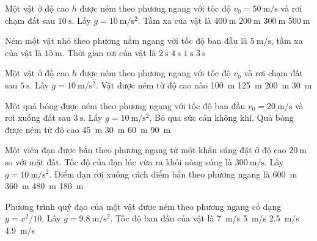 \begin{ex}
	Một vật ở độ cao $h$ được ném theo phương ngang với tốc độ $v_0=\SI{50}{\meter/\second}$ và rơi chạm đất sau $\SI{10}{\second}$. Lấy $g=\SI{10}{\meter/\second^2}$. Tầm xa của vật là	
	\choice
	{$\SI{400}{\meter}$}
	{$\SI{200}{\meter}$}
	{$\SI{300}{\meter}$}
	{$\SI{500}{\meter}$}
	\loigiai{}
\end{ex}
\begin{ex}
	Ném một vật nhỏ theo phương nằm ngang với tốc độ ban đầu là $\SI{5}{\meter/\second}$, tầm xa của vật là $\SI{15}{\meter}$. Thời gian rơi của vật là
	\choice
	{$\SI{2}{\second}$}
	{$\SI{4}{\second}$}
	{$\SI{1}{\second}$}
	{$\SI{3}{\second}$}
	\loigiai{}
\end{ex}
\begin{ex}
	Một vật ở độ cao $h$ được ném theo phương ngang với tốc độ $v_0$ và rơi chạm đất sau $\SI{5}{\second}$. Lấy $g=\SI{10}{\meter/\second^2}$. Vật được ném từ độ cao nào
	\choice
	{\SI{100}{\meter}}
	{\SI{125}{\meter}}
	{\SI{200}{\meter}}
	{\SI{30}{\meter}}
	\loigiai{}
\end{ex}
\begin{ex}
	Một quả bóng được ném theo phương ngang với tốc độ ban đầu $v_0=\SI{20}{\meter/\second}$ và rơi xuống đất sau $\SI{3}{\second}$. Lấy $g=\SI{10}{\meter/\second^2}$. Bỏ qua sức cản không khí. Quả bóng được ném từ độ cao
	\choice
	{\SI{45}{\meter}}
	{\SI{30}{\meter}}
	{\SI{60}{\meter}}
	{\SI{90}{\meter}}
	\loigiai{}
\end{ex}
\begin{ex}
	Một viên đạn được bắn theo phương ngang từ một khẩu súng đặt ở độ cao $\SI{20}{\meter}$ so với mặt đất. Tốc độ của đạn lúc vừa ra khỏi nòng súng là $\SI{300}{\meter/\second}$. Lấy $g=\SI{10}{\meter/\second^2}$. Điểm đạn rơi xuống cách điểm bắn theo phương ngang là
	\choice
	{\SI{600}{\meter}}
	{\SI{360}{\meter}}
	{\SI{480}{\meter}}
	{\SI{180}{\meter}}
	\loigiai{}
\end{ex}
\begin{ex}
	Phương trình quỹ đạo của một vật được ném theo phương ngang có dạng $y=x^2/10$. Lấy $g=\SI{9.8}{\meter/\second^2}$. Tốc độ ban đầu của vật là 
	\choice
	{\SI{7}{\meter/\second}}
	{\SI{5}{\meter/\second}}
	{\SI{2.5}{\meter/\second}}
	{\SI{4.9}{\meter/\second}}
	\loigiai{}
\end{ex}

